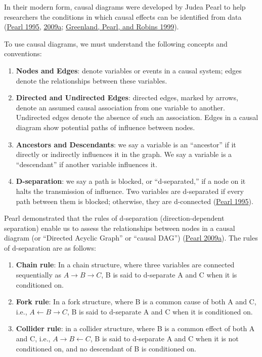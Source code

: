 \documentclass[
  singlecolumn]{article}
\begin{document}
In their modern form, causal diagrams were developed by Judea Pearl to
help researchers the conditions in which causal effects can be
identified from data (\protect\hyperlink{ref-pearl1995}{Pearl 1995},
\protect\hyperlink{ref-pearl2009}{2009a};
\protect\hyperlink{ref-greenland1999}{Greenland, Pearl, and Robins
1999}).

To use causal diagrams, we must understand the following concepts and
conventions:

\begin{enumerate}
\def\labelenumi{\arabic{enumi}.}
\item
  \textbf{Nodes and Edges}: denote variables or events in a causal
  system; edges denote the relationships between these variables.
\item
  \textbf{Directed and Undirected Edges}: directed edges, marked by
  arrows, denote an assumed causal association from one variable to
  another. Undirected edges denote the absence of such an association.
  Edges in a causal diagram show potential paths of influence between
  nodes.
\item
  \textbf{Ancestors and Descendants}: we say a variable is an
  ``ancestor'' if it directly or indirectly influences it in the graph.
  We say a variable is a ``descendant'' if another variable influences
  it.
\item
  \textbf{D-separation}: we say a path is blocked, or ``d-separated,''
  if a node on it halts the transmission of influence. Two variables are
  d-separated if every path between them is blocked; otherwise, they are
  d-connected (\protect\hyperlink{ref-pearl1995}{Pearl 1995}).
\end{enumerate}

Pearl demonstrated that the rules of d-separation (direction-dependent
separation) enable us to assess the relationships between nodes in a
causal diagram (or ``Directed Acyclic Graph'' or ``causal DAG'')
(\protect\hyperlink{ref-pearl2009}{Pearl 2009a}). The rules of
d-separation are as follows:

\begin{enumerate}
\def\labelenumi{\alph{enumi}.}
\item
  \textbf{Chain rule}: In a chain structure, where three variables are
  connected sequentially as \(A \rightarrow B \rightarrow C\), B is said
  to d-separate A and C when it is conditioned on.
\item
  \textbf{Fork rule}: In a fork structure, where B is a common cause of
  both A and C, i.e., \(A \leftarrow B \rightarrow C\), B is said to
  d-separate A and C when it is conditioned on.
\item
  \textbf{Collider rule}: in a collider structure, where B is a common
  effect of both A and C, i.e., \(A \rightarrow B \leftarrow C\), B is
  said to d-separate A and C when it is not conditioned on, and no
  descendant of B is conditioned on.
\end{enumerate}
\end{document}
